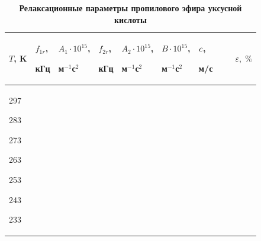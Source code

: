 \begin{table}[h!]

\renewcommand{\bfdefault}{b}

\centering

\begin{minipage} [t]{15.8cm}

\caption{\small \bfseries Релаксационные параметры пропилового эфира уксусной кислоты}\vspace{-3mm}

\begin{tabular}{p{45pt}|p{45pt}|p{45pt}|p{45pt}|p{45pt}|p{45pt}|p{45pt}|p{35pt}}

\hline

\centering

$T$, K

& \centering

$f_{1r}$,\par

 кГц 

& \centering

$A_1 \cdot 10^{15}$,\par

 м$^{-1}$с$^2$

 & \centering

$f_{2r}$,\par

 кГц 

 & \centering

$A_2 \cdot 10^{15}$,\par

 м$^{-1}$с$^2$

 & \centering

$B\cdot 10^{15}$,\par 

 м$^{-1}$с$^2$

 & \centering

$c\vphantom{^{\frac12}}$,\par м/с

& 

~~~$\varepsilon ,\;\% $ 

\\

\hline

\centering

297 \par 283 \par 273 \par 263 \par 253 \par 243 \par 233& \centering


\end{tabular}
\end{minipage}
\end{table}
